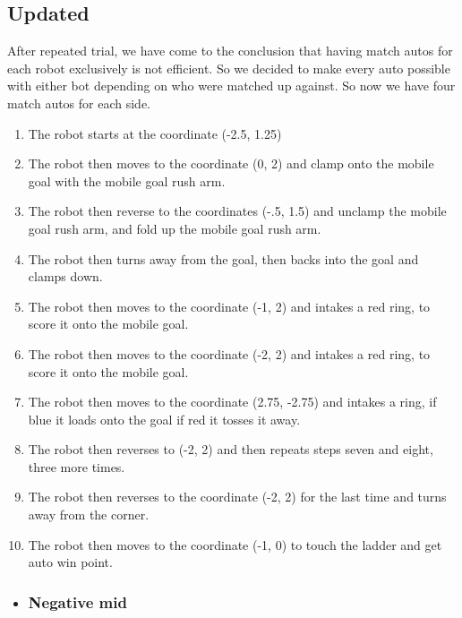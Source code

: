 \subsection{Updated}
After repeated trial, we have come to the conclusion that having match autos for each robot exclusively is not efficient. So we decided to make every auto possible with either bot depending on who were matched up against. So now we have four match autos for each side.
\begin{enumerate}
    \item The robot starts at the coordinate (-2.5, 1.25)
    \item The robot then moves to the coordinate (0, 2) and clamp onto the mobile goal with the mobile goal rush arm.
    \item The robot then reverse to the coordinates (-.5, 1.5) and unclamp the mobile goal rush arm, and fold up the mobile goal rush arm.
    \item The robot then turns away from the goal, then backs into the goal and clamps down.
    \item The robot then moves to the coordinate (-1, 2) and intakes a red ring, to score it onto the mobile goal.
    \item The robot then moves to the coordinate (-2, 2) and intakes a red ring, to score it onto the mobile goal.
    \item The robot then moves to the coordinate (2.75, -2.75) and intakes a ring, if blue it loads onto the goal if red it tosses it away.
    \item The robot then reverses to (-2, 2) and then repeats steps seven and eight, three more times.
    \item The robot then reverses to the coordinate (-2, 2) for the last time and turns away from the corner.
    \item The robot then moves to the coordinate (-1, 0) to touch the ladder and get auto win point.
\end{enumerate}
\begin{itemize}
    \item \subsubsection{Negative mid}
\end{itemize}
